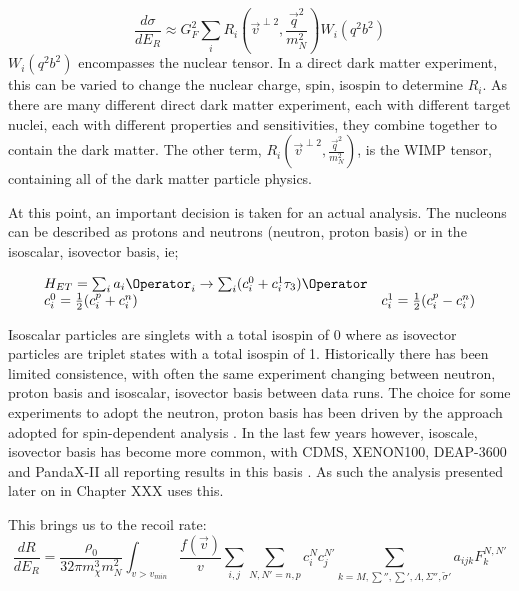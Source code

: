 \begin{equation}
    \frac{d\sigma}{dE_R} \approx G_F^2 \sum_{i} R_i (\vec{v}^{\perp 2}, \frac{\vec{q}^2}{m_N^2}) W_i(q^2b^2)
\end{equation}
$W_i(q^2b^2)$ encompasses the nuclear tensor.
In a direct dark matter experiment, this can be varied to change the nuclear charge, spin, isospin to determine $R_i$.
As there are many different direct dark matter experiment, each with different target nuclei, each with different properties and sensitivities, they combine together to contain the dark matter.
The other term, $R_i (\vec{v}^{\perp 2}, \frac{\vec{q}^2}{m_N^2})$, is the WIMP tensor, containing all of the dark matter particle physics.



\par
At this point, an important decision is taken for an actual analysis.
The nucleons can be described as protons and neutrons ({neutron, proton} basis) or in the {isoscalar, isovector} basis, ie;

\begin{equation}
\begin{array}{lcl}
    H_{ET} = \sum_i a_i \Operator_i \rightarrow \sum_i (c_i^0 + c_i^1 \tau_3)\Operator \\
    c_i^0 = \frac{1}{2}(c_i^p + c_i^n) & c_i^1 = \frac{1}{2}(c_i^p - c_i^n)
\end{array}
\label{eq:EFT_Operators}
\end{equation}

Isoscalar particles are singlets with a total isospin of 0 where as isovector particles are triplet states with a total isospin of 1.
Historically there has been limited consistence, with often the same experiment changing between {neutron, proton} basis and {isoscalar, isovector} basis between data runs.
The choice for some experiments to adopt the {neutron, proton} basis has been driven by the approach adopted for spin-dependent analysis .
In the last few years however, {isoscale, isovector} basis has become more common, with CDMS, XENON100, DEAP-3600 and PandaX-II all reporting results in this basis \cite{cdms_eft_ref,xenon100_eft_ref,deap3600_eft_ref,pandax_2_eft_ref}.
As such the analysis presented later on in Chapter XXX uses this.


\par
This brings us to the recoil rate:
\begin{equation}
    \frac{dR}{dE_R} = \frac{\rho_0}{32\pi m_\chi^3 m_N^2} \int_{v>v_{min}} \frac{f(\vec{v})}{v} \sum_{i,j} \sum_{N,N'=n,p} c^{N}_i c^{N'}_j \sum_{k=M, \sum'', \sum', \Lambda, \Sigma'', \tilde{\sigma}'} a_{ijk}F_k^{N,N'}
\label{eq:ref_recoil_spectrum}
\end{equation}

